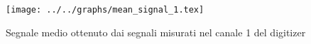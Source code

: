 \begin{figure}[h] \centering\texttt{[image: ../../graphs/mean\_signal\_1.tex]}\caption{Segnale medio ottenuto dai segnali misurati nel canale 1 del digitizer}\label{gr:mean_signal_1} \end{figure}
